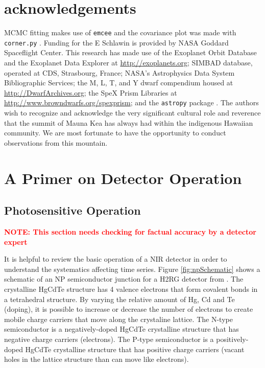 \documentclass{aastex62}
\begin{document}
\section*{acknowledgements}
MCMC fitting makes use of \texttt{emcee} \citep{foreman-mackey2013emcee} and the covariance plot was made with \texttt{corner.py} \citep{foremanCorner}.
Funding for the E Schlawin is provided by NASA Goddard Spaceflight Center.
This research has made
use of the Exoplanet Orbit Database and the Exoplanet Data Explorer at \url{http://exoplanets.org}; SIMBAD database, operated at CDS, Strasbourg,
France; NASA's Astrophysics Data System Bibliographic
Services; the M, L, T, and Y dwarf compendium
housed at \url{http://DwarfArchives.org}; the SpeX Prism
Libraries at \url{http://www.browndwarfs.org/spexprism}; and the \texttt{astropy} package \citep{astropy2013}. 
The authors wish to recognize and acknowledge the very significant cultural role and reverence that the summit of Mauna Kea has always had within the indigenous Hawaiian community. We are most fortunate to have the opportunity to conduct observations from this mountain.

\appendix


\section{A Primer on Detector Operation}\label{sec:detectorPrimer}

\subsection{Photosensitive Operation}
\textcolor{red}{\textbf{NOTE: This section needs checking for factual accuracy by a detector expert}}

It is helpful to review the basic operation of a NIR detector \citep[e.g.][]{rieke2007irDetectorReview} in order to understand the systematics affecting time series.
Figure \ref{fig:npSchematic} shows a schematic of an NP semiconductor junction for a H2RG detector from \citet{smith2008imgPersistence}.
The crystalline HgCdTe structure has 4 valence electrons that form covalent bonds in a tetrahedral structure.
By varying the relative amount of Hg, Cd and Te (doping), it is possible to increase or decrease the number of electrons to create mobile charge carriers that move along the crystaline lattice.
The N-type semiconductor is a negatively-doped HgCdTe crystalline structure that has negative charge carriers (electrons).
The P-type semiconductor is a positively-doped HgCdTe crystalline structure that has positive charge carriers (vacant holes in the lattice structure than can move like electrons).
\end{document}

